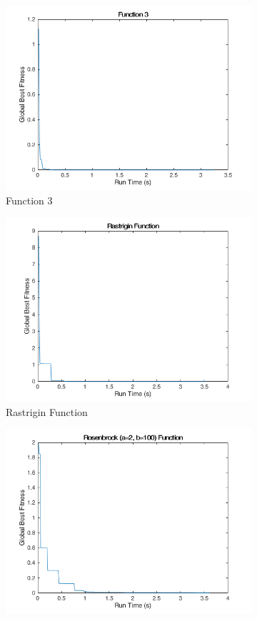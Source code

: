\begin{figure}
\begin{subfigure}[b]{0.4\textwidth}
    \includegraphics[width=\textwidth]{img/summary/function3}
    \caption{Function 3}
  \end{subfigure}
  \begin{subfigure}[b]{0.4\textwidth}
    \includegraphics[width=\textwidth]{img/summary/rastrigin}
    \caption{Rastrigin Function}
  \end{subfigure}
  \begin{subfigure}[b]{0.4\textwidth}
    \includegraphics[width=\textwidth]{img/summary/rosenbrock2-100}

\end{subfigure}
\end{figure}
